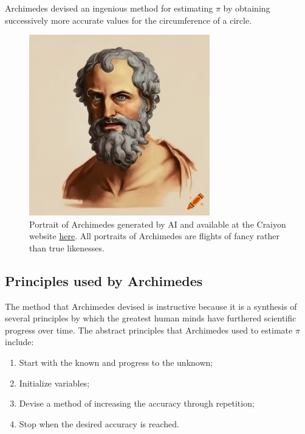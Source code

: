 \documentclass[
  a4paper,
]{article}
\begin{document}
Archimedes devised an ingenious method for estimating \(\pi\) by
obtaining successively more accurate values for the circumference of a
circle.

\begin{figure}
\centering
\includegraphics[width=0.7\textwidth,height=\textheight]{images/Archimedes-AI-generated-portrait.png}
\caption{Portrait of Archimedes generated by AI and available at the
Craiyon website
\href{https://www.craiyon.com/image/JEmP4rPCRW25xyCULOeMSw}{here}. All
portraits of Archimedes are flights of fancy rather than true
likenesses.}\label{fig:Archimedes-AI}
\end{figure}

\subsection{Principles used by
Archimedes}\label{principles-used-by-archimedes}

The method that Archimedes devised is instructive because it is a
synthesis of several principles by which the greatest human minds have
furthered scientific progress over time. The abstract principles that
Archimedes used to estimate \(\pi\) include:

\begin{enumerate}
\item
  Start with the known and progress to the unknown;
\item
  Initialize variables;
\item
  Devise a method of increasing the accuracy through repetition;
\item
  Stop when the desired accuracy is reached.
\end{enumerate}
\end{document}
